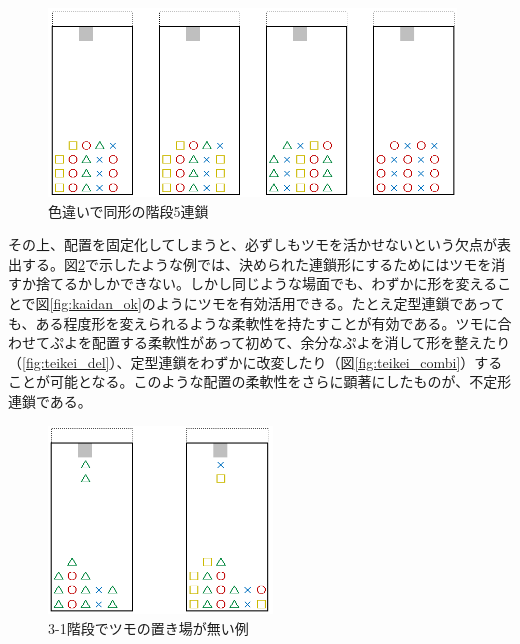 \documentclass[12pt]{jsarticle}
\begin{document}
\begin{figure}[hbt]
  \begin{center}
  \includegraphics[height=5cm]{img/kaidan5.png}
  \caption{色違いで同形の階段5連鎖} \label{fig:kaidan5}
\end{center}
\end{figure}

その上、配置を固定化してしまうと、必ずしもツモを活かせないという欠点が表出する。図\ref{fig:kaidan_ng}で示したような例では、決められた連鎖形にするためにはツモを消すか捨てるかしかできない。しかし同じような場面でも、わずかに形を変えることで図\ref{fig:kaidan_ok}のようにツモを有効活用できる。たとえ定型連鎖であっても、ある程度形を変えられるような柔軟性を持たすことが有効である。ツモに合わせてぷよを配置する柔軟性があって初めて、余分なぷよを消して形を整えたり（\ref{fig:teikei_del}）、定型連鎖をわずかに改変したり（図\ref{fig:teikei_combi}）することが可能となる。このような配置の柔軟性をさらに顕著にしたものが、不定形連鎖である。

\begin{figure}[hbt]
  \begin{center}
  \includegraphics[height=5cm]{img/kaidan_ng.png}
  \caption{3-1階段でツモの置き場が無い例} \label{fig:kaidan_ng}
\end{center}
\end{figure}
\end{document}
